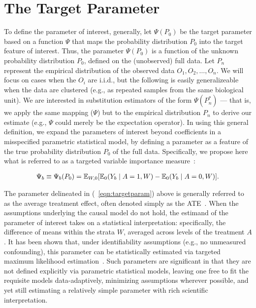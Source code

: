 \section{The Target Parameter}\label{targetparam}

To define the parameter of interest, generally, let $\Psi(P_{0})$ be the
target parameter based on a function $\Psi$ that maps the probability
distribution $P_{0}$ into the target feature of interest. Thus, the parameter
$\Psi(P_{0})$ is a function of the unknown probability distribution $P_{0}$,
defined on the (unobserved) full data. Let $P_{n}$ represent the empirical
distribution of the observed data $O_{1},O_{2}, \dots, O_{n}$. We will focus on
cases when the $O_i$ are i.i.d., but the following is easily generalizeable when
the data are clustered (e.g., as repeated samples from the same biological
unit). We are interested in substitution estimators of the form
$\Psi(P_{n}^{*})$ --- that is, we apply the same mapping ($\Psi$) but to the
empirical distribution $P_n$ to derive our estimate (e.g., $\Psi$ could merely
be the expectation operator). In using this general definition, we expand the
parameters of interest beyond coefficients in a misspecified parametric
statistical model, by defining a parameter as a feature of the true probability
distribution $P_{0}$ of the full data. Specifically, we propose here what is
referred to as a targeted variable importance
measure~\cite{bembom2009biomarker}:

\begin{eqnarray}
\label{eqn:targetparam}
\Psi_{b} \equiv \Psi_{b}(P_{0}) = \mathbb{E} _{W,0}[\mathbb{E}_{0}(Y_{b} \mid A = 1, W) - \mathbb{E}_{0}(Y_{b} \mid A = 0, W)].
\end{eqnarray}

The parameter delineated in (~\ref{eqn:targetparam}) above is generally referred
to as the average treatment effect, often denoted simply as the
ATE~\cite{rosenbaum1983central}. When the assumptions underlying the causal
model do not hold, the estimand of the parameter of interest takes on a
statistical interpretation: specifically, the difference of means within the
strata $W$, averaged across levels of the treatment $A$. It has been shown that,
under identifiability assumptions (e.g., no unmeasured confounding), this
parameter can be statistically estimated via targeted maximum likelihood
estimation~\cite{van2011targeted}. Such parameters are significant in that they
are not defined explicitly via parametric statistical models, leaving one free
to fit the requisite models data-adaptively, minimizing assumptions wherever
possible, and yet still estimating a relatively simple parameter with rich
scientific interpretation.


